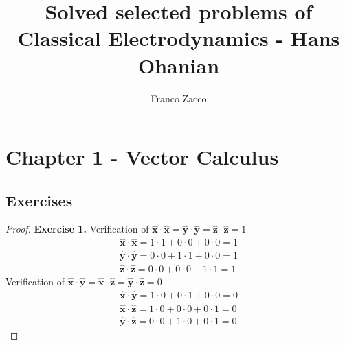 \documentclass[11pt]{article}
\title{\textbf{Solved selected problems of Classical Electrodynamics - Hans Ohanian}}
\author{Franco Zacco}
\date{}
\newcommand{\hatx}{\bm{\hat{x}}}
\newcommand{\haty}{\bm{\hat{y}}}
\newcommand{\hatz}{\bm{\hat{z}}}
\theoremstyle{definition}
\begin{document}
\maketitle
\thispagestyle{empty}

\section*{Chapter 1 - Vector Calculus}

\subsection*{Exercises}

\begin{proof}{\textbf{Exercise 1.}}
    Verification of
    $\hatx \cdot \hatx = \haty \cdot \haty = \hatz \cdot \hatz = 1$
    \begin{align*}
        \hatx \cdot \hatx = 1 \cdot 1 + 0 \cdot 0 + 0 \cdot 0 = 1\\
        \haty \cdot \haty = 0 \cdot 0 + 1 \cdot 1 + 0 \cdot 0 = 1\\
        \hatz \cdot \hatz = 0 \cdot 0 + 0 \cdot 0 + 1 \cdot 1 = 1
    \end{align*}
    Verification of
    $\hatx \cdot \haty = \hatx \cdot \hatz = \haty \cdot \hatz = 0$
    \begin{align*}
        \hatx \cdot \haty = 1 \cdot 0 + 0 \cdot 1 + 0 \cdot 0 = 0\\
        \hatx \cdot \hatz = 1 \cdot 0 + 0 \cdot 0 + 0 \cdot 1 = 0\\
        \haty \cdot \hatz = 0 \cdot 0 + 1 \cdot 0 + 0 \cdot 1 = 0
    \end{align*}
\end{proof}
\cleardoublepage
\end{document}
